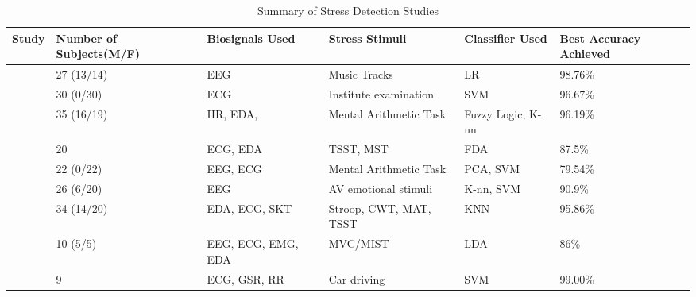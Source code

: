 \begin{table}[!h]
  \centering
  \begin{tabularx}{\textwidth}{|X|X|X|X|X|X|}
  \hline
  \textbf{Study}        & \textbf{Number of Subjects(M/F)} & \textbf{Biosignals Used}   & \textbf{Stress Stimuli}                                    & \textbf{Classifier Used} & \textbf{Best Accuracy Achieved} \\ \hline
  \textcite{Asif2019-cd}           & 27 (13/14)                  & EEG                        & Music Tracks                                       &  LR                  & 98.76\%                        \\ \hline
  \textcite{cheema}        & 30 (0/30)                   &  ECG                   & Institute examination                              & SVM                   & 96.67\%                        \\ \hline
  \textcite{Airij2018-an}              & 35 (16/19)                  & HR, EDA,              & Mental Arithmetic Task                             & Fuzzy Logic, K-nn        & 96.19\%                        \\ \hline
  \textcite{Vila2018-pz}         & 20                          & ECG, EDA                   & TSST, MST                                          & FDA                      & 87.5\%                         \\ \hline
  \textcite{Xia2018-rl}            & 22 (0/22)                   & EEG, ECG                   & Mental Arithmetic Task                             & PCA, SVM                 & 79.54\%                        \\ \hline
  \textcite{Khosrowabadi2011ABI}         & 26 (6/20)                   & EEG                        & AV emotional stimuli                               & K-nn, SVM                & 90.9\%                         \\ \hline
  \textcite{Anusha2018-sw}         & 34 (14/20)                  & EDA, ECG, SKT              & Stroop, CWT, MAT, TSST                             &  KNN               & 95.86\%                        \\ \hline
  \textcite{Minguillon2018-yj}    & 10 (5/5)                    & EEG, ECG, EMG, EDA         & MVC/MIST                                           & LDA                      & 86\%                           \\ \hline
  \textcite{Chen2017-dr}          & 9                           & ECG, GSR, RR               & Car driving                                        & SVM                      & 99.00\%                        \\ \hline
  \end{tabularx}
  \caption{Summary of Stress Detection Studies}
  \label{table:biosignal_studies}
  \end{table}
  
